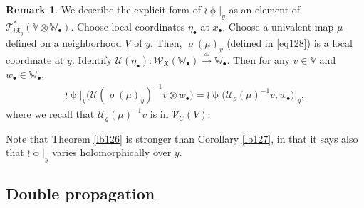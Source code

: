 \documentclass[12pt,b5paper,notitlepage]{report}
\theoremstyle{definition}
\newtheorem{rem}[df]{Remark}
\theoremstyle{plain}
\newcommand{\fk}{\mathfrak}
\newcommand{\mc}{\mathcal}
\newcommand{\scr}{\mathscr}
\newcommand{\blt}{\bullet}
\newcommand{\Vbb}{\mathbb V}
\newcommand{\Wbb}{\mathbb W}
\numberwithin{equation}{section}
\begin{document}
\begin{rem}
We describe the explicit form of $\wr\upphi|_y$ as an element of $\scr T_{\wr\fk X_y}^*(\Vbb\otimes\Wbb_\blt)$. Choose  local coordinates  $\eta_\blt$ at $x_\blt$. Choose  a univalent map $\mu$ defined on a neighborhood $V$ of $y$. Then, $\varrho(\mu)_y$ (defined in \eqref{eq128}) is a local coordinate at $y$.  Identify $\mc U(\eta_\blt):\scr W_{\fk X}(\Wbb_\blt)\xrightarrow{\simeq}\Wbb_\blt$.  Then for any $v\in\Vbb$ and $w_\blt\in\Wbb_\blt$,
\begin{align}
\wr\upphi\big|_y\big(\mc U(\varrho(\mu)_y)^{-1}v\otimes w_\blt\big)=\wr\upphi\big(\mc U_\varrho(\mu)^{-1}v,w_\blt\big)\big|_y,
\end{align}
where we recall that $\mc U_\varrho(\mu)^{-1}v$ is in $\scr V_C(V)$.

Note that Theorem \ref{lb126} is stronger than Corollary \ref{lb127}, in that it says also that $\wr\upphi|_y$ varies holomorphically over $y$.
\end{rem}




\subsection*{Double propagation}
\end{document}
